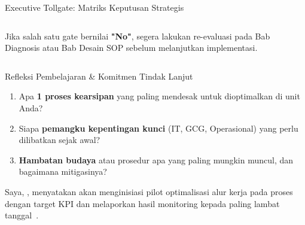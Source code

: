 \documentclass[aspectratio=169,11pt]{beamer}
\begin{document}
\begin{frame}{Executive Tollgate: Matriks Keputusan Strategis}
\begin{columns}
        \begin{orangebox}
            \scriptsize Jika salah satu gate bernilai \textbf{"No"}, segera lakukan re-evaluasi pada Bab Diagnosis atau Bab Desain SOP sebelum melanjutkan implementasi.
        \end{orangebox}
    \end{columns}
\end{frame}

\begin{frame}{Refleksi Pembelajaran \& Komitmen Tindak Lanjut}
    \vspace{0.2cm}
    \begin{premiumbox}
        \small
        \begin{enumerate}
            \item Apa \textbf{1 proses kearsipan} yang paling mendesak untuk dioptimalkan di unit Anda?
            \item Siapa \textbf{pemangku kepentingan kunci} (IT, GCG, Operasional) yang perlu dilibatkan sejak awal?
            \item \textbf{Hambatan budaya} atau prosedur apa yang paling mungkin muncul, dan bagaimana mitigasinya?
        \end{enumerate}
    \end{premiumbox}
    \vspace{0.2cm}
    \begin{orangebox}
        \small
        Saya, \underline{\hspace{3.5cm}}, menyatakan akan menginisiasi pilot optimalisasi alur kerja pada proses \underline{\hspace{3.5cm}} dengan target KPI \underline{\hspace{2.5cm}} dan melaporkan hasil monitoring kepada \underline{\hspace{3cm}} paling lambat tanggal~\underline{\hspace{2.5cm}}.
    \end{orangebox}
\end{frame}
\end{document}

